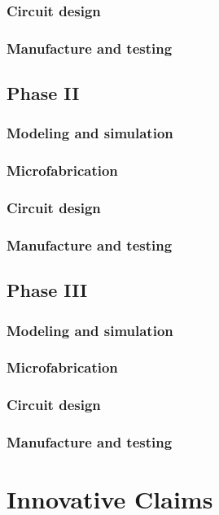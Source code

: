 \subsubsection{Circuit design}
\subsubsection{Manufacture and testing}
\subsection{Phase II}
\subsubsection{Modeling and simulation}
\subsubsection{Microfabrication}
\subsubsection{Circuit design}
\subsubsection{Manufacture and testing}
\subsection{Phase III}
\subsubsection{Modeling and simulation}
\subsubsection{Microfabrication}
\subsubsection{Circuit design}
\subsubsection{Manufacture and testing}

\section{Innovative Claims}\label{sec:inno}

